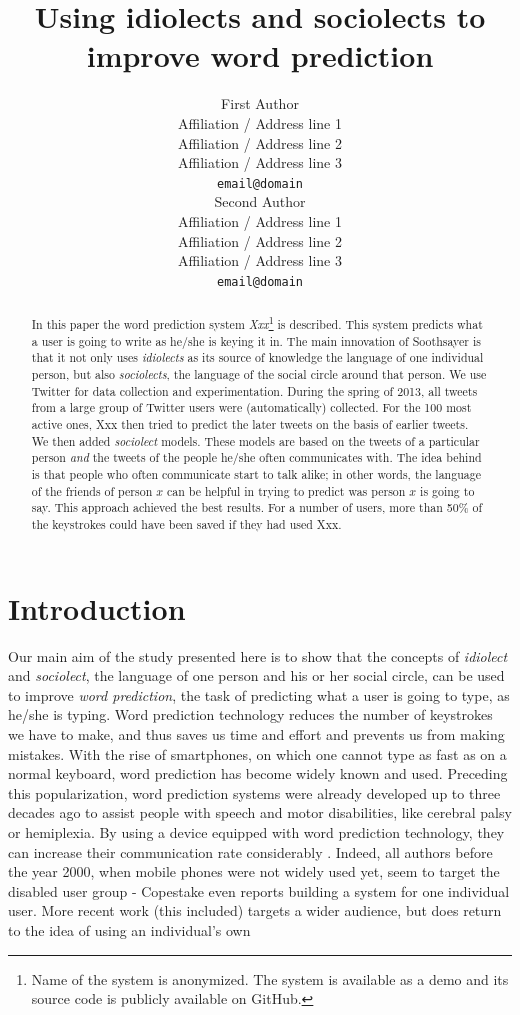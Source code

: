 \documentclass[11pt]{article}
\title{Using idiolects and sociolects to improve word prediction}
\author{First Author \\
  Affiliation / Address line 1 \\
  Affiliation / Address line 2 \\
  Affiliation / Address line 3 \\
  {\tt email@domain} \\\And
  Second Author \\
  Affiliation / Address line 1 \\
  Affiliation / Address line 2 \\
  Affiliation / Address line 3 \\
  {\tt email@domain} \\}
\date{}
\begin{document}
\maketitle

\begin{abstract}
In this paper the word prediction system \emph{Xxx}\footnote{Name of the system is anonymized. The system is available as a demo and its source code is publicly available on GitHub.} is described. This system predicts what a user is going to write as he/she is keying it in. The main innovation of Soothsayer is that it not only uses \emph{idiolects} as its source of knowledge the language of one individual person, but also \emph{sociolects}, the language of the social circle around that person. We use Twitter for data collection and experimentation. During the spring of 2013, all tweets from a large group of Twitter users were (automatically) collected. For the 100 most active ones, Xxx then tried to predict the later tweets on the basis of earlier tweets. We then added \emph{sociolect} models. These models are based on the tweets of a particular person \emph{and} the tweets of the people he/she often communicates with. The idea behind is that people who often communicate start to talk alike; in other words, the language of the friends of person $x$ can be helpful in trying to predict was person $x$ is going to say. This approach achieved the best results. For a number of users, more than 50\% of the keystrokes could have been saved if they had used Xxx. 
\end{abstract}

\section{Introduction} \label{intro}

Our main aim of the study presented here is to show that the concepts of \emph{idiolect} and \emph{sociolect}, the language of one person and his or her social circle, can be used to improve \emph{word prediction}, the task of predicting what a user is going to type, as he/she is typing. Word prediction technology reduces the number of keystrokes we have to make, and thus saves us time and effort and prevents us from making mistakes. With the rise of smartphones,  on which one  cannot type as fast as on a normal keyboard, word prediction has become widely known and used. Preceding this popularization, word prediction systems were already developed up to three decades ago to assist people with speech and motor disabilities, like cerebral palsy or hemiplexia. By using a device equipped with word prediction technology, they can increase their communication rate considerably \cite{Garay-Vitoria+06}. Indeed, all authors before the year 2000, when mobile phones were not widely used yet, seem to target the disabled user group - Copestake  even reports building a system for one individual user. More recent work (this included) targets a wider audience, but does return to the idea of using an individual's own 
\end{document}
